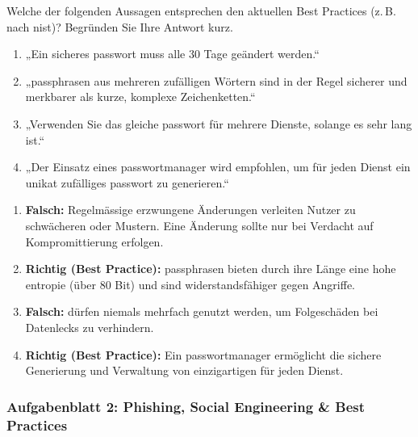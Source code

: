 \documentclass[12pt,a4paper]{article}
\newcounter{subsubsubsection}[subsubsection]
\begin{document}
\newpage


\begin{taskbox}
Welche der folgenden Aussagen entsprechen den aktuellen Best Practices \newline(z.\,B. nach \gls{nist})? Begründen Sie Ihre Antwort kurz.
\begin{enumerate}[label=\Alph*)]
    \item „Ein sicheres \gls{passwort} muss alle 30 Tage geändert werden.“
    \item „\gls{passphrase}n aus mehreren zufälligen Wörtern sind in der Regel sicherer und merkbarer als kurze, komplexe Zeichenketten.“
    \item „Verwenden Sie das gleiche \gls{passwort} für mehrere Dienste, solange es sehr lang ist.“
    \item „Der Einsatz eines \gls{passwortmanager} wird empfohlen, um für jeden Dienst ein unikat zufälliges \gls{passwort} zu generieren.“
\end{enumerate}
\end{taskbox}

\begin{solutionbox}[Musterlösung 2.3.1.3.1]
\begin{enumerate}[label=\Alph*)]
    \item \textbf{Falsch:} Regelmässige erzwungene Änderungen verleiten Nutzer zu \mbox{schwächeren}  oder Mustern. Eine Änderung sollte nur bei Verdacht auf Kompromittierung erfolgen.
    \item \textbf{Richtig (Best Practice):} \gls{passphrase}n bieten durch ihre Länge eine hohe \gls{entropie} (über 80 Bit) und sind widerstandsfähiger gegen Angriffe.
    \item \textbf{Falsch:}  dürfen niemals mehrfach genutzt werden, um \mbox{Folgeschäden} bei Datenlecks zu verhindern.
    \item \textbf{Richtig (Best Practice):} Ein \gls{passwortmanager} ermöglicht die sichere \mbox{Generierung} und Verwaltung von einzigartigen  für jeden Dienst.
\end{enumerate}
\end{solutionbox}

\newpage

\subsubsection{Aufgabenblatt 2: Phishing, Social Engineering \& Best Practices}
\label{subsec:aufgaben_phishing}
\end{document}
